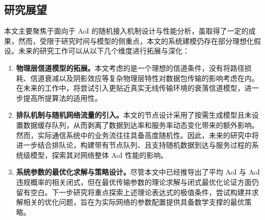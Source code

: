\subsection{研究展望}
本文主要聚焦于面向于 AoI 的随机接入机制设计与性能分析，虽取得了一定的成果，然而，受限于研究时间与模型的侧重点，本文的系统建模仍存在部分理想化假设。未来的研究工作可以从以下几个维度进行拓展与深化：
\begin{enumerate}[wide]
    \item \textbf{物理层信道模型的拓展。}本文考虑的是一个理想的信道条件，没有将路径损耗、信道衰减以及阴影效应等复杂物理层特性对数据包传输的影响考虑在内。在未来的工作中，将尝试引入更贴近真实无线传输环境的衰落信道模型，进一步提高所提算法的适用性。
    \item \textbf{排队机制与随机网络流量的引入。}本文的节点设计采用了按需生成模型且未设置数据缓存队列，从而剥离了数据到达率和服务率动态变化带来的额外影响。然而，实际通信系统中的业务流往往具备高度随机性。因此，未来的研究中将进一步结合排队论，构建带有节点队列、且支持随机数据到达与服务过程的系统级模型，探索其对网络整体 AoI 性能的影响。
    \item \textbf{系统参数的最优化求解与策略设计。}尽管本文中已经推导出了平均 AoI 与 AoI 违规概率的相关闭式，但在最优传输参数的理论求解与闭式最优化论证方面仍留有空白。下一步研究将重点探索上述理论表达式的极值条件，尝试构建并求解相关的优化问题，旨在为实际网络的参数配置提供具备数学支撑的最优策略。
\end{enumerate}

